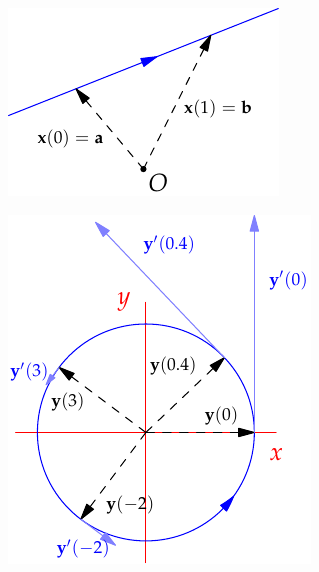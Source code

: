 \begin{minipage}[t]{0.3\linewidth}\vspace{0pt}
\flushright\includegraphics{curves-line}\par
\flushright\href{http://www.math.uci.edu/~ndonalds/math162a/curves-animcircle.html}{\includegraphics{curves-animcircle2}}
\end{minipage}

\clearpage


